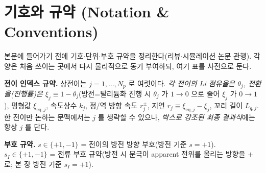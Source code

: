 \documentclass[11pt,a4paper]{article}
\newcommand{\eq}{\mathrm{eq}}
\begin{document}
\tableofcontents
\newpage

\section{기호와 규약 (Notation \& Conventions)}\label{sec:notation}
본문에 들어가기 전에 기호$\cdot$단위$\cdot$부호 규약을 정리한다(리뷰$\cdot$시뮬레이션 논문 관행). 각 양은 처음
쓰이는 곳에서 다시 물리적으로 동기 부여하되, 여기 표를 사전으로 둔다.

\textbf{전이 인덱스 규약.} 상전이는 $j=1,\dots,N_p$ 로 여럿이다. \emph{각 전이의 Li 점유율은 $\theta_j$, 전환율(진행률)은 $\xi_j\equiv1-\theta_j$}(방전=탈리튬화 진행 시 $\theta_j$ 가 $1\to0$ 으로 줄어 $\xi_j$ 가 $0\to1$), 평형값
$\xi_{\eq,j}$, 속도상수 $k_j$, 정/역 방향 속도 $r_j^\pm$, 지연 $r_j\equiv\xi_{\eq,j}-\xi_j$, 꼬리 길이
$L_{q,j}$. 한 전이만 논하는 문맥에서는 $j$ 를 생략할 수 있으나, \emph{박스로 강조된 최종 결과식}에는 항상 $j$ 를
단다.

\textbf{부호 규약.} $s\in\{+1,-1\}$ = 전이의 방전 방향 부호(방전 기준 $s=+1$). $s_I\in\{+1,-1\}$ = 전류 부호
규약(방전 시 분극이 apparent 전위를 올리는 방향을 $+$ 로; 본 장 방전 기준 $s_I=+1$).
\end{document}
